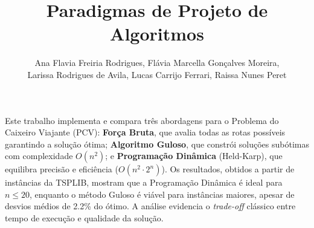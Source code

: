 \documentclass[12pt]{article}
\title{Paradigmas de Projeto de Algoritmos}
\author{Ana Flavia Freiria Rodrigues\inst{1}, Flávia Marcella Gonçalves Moreira\inst{1}, \\ Larissa Rodrigues de Avila\inst{1}, Lucas Carrijo Ferrari\inst{1}, Raissa Nunes Peret\inst{1}}
\begin{document}
 

\maketitle
     
\begin{resumo} 
    Este trabalho implementa e compara três abordagens para o Problema do Caixeiro Viajante (PCV): \textbf{Força Bruta}, que avalia todas as rotas possíveis garantindo a solução ótima; \textbf{Algoritmo Guloso}, que constrói soluções subótimas com complexidade $O(n^2)$; e \textbf{Programação Dinâmica} (Held-Karp), que equilibra precisão e eficiência ($O(n^2 \cdot 2^n)$). Os resultados, obtidos a partir de instâncias da TSPLIB, mostram que a Programação Dinâmica é ideal para $n \leq 20$, enquanto o método Guloso é viável para instâncias maiores, apesar de desvios médios de 2.2\% do ótimo. A análise evidencia o \textit{trade-off} clássico entre tempo de execução e qualidade da solução.
\end{resumo}







\end{document}
